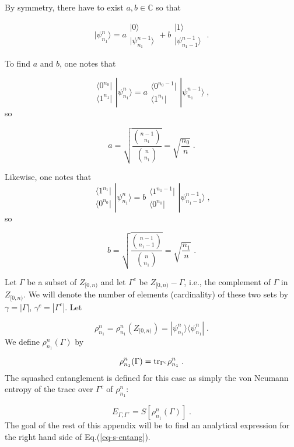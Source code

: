 \documentclass[12pt]{article}%
\newcommand{\qed}[0]{\newline\noindent{\bf QED }}
\newcommand{\bra}[1]{\langle#1|}
\newcommand{\ket}[1]{|#1\rangle}
\newcommand{\tr}[0]{{\rm tr }}
\newcommand{\beq}{\begin{equation}}
\newcommand{\eeq}{\end{equation}}
\newcommand{\CC}[0]{{ \mathbb{C}} }
\newcommand{\brazo}{ \begin{array}{r}
 \bra{0^{n_0}}
 \\
 \bra{1^{n_1}}
 \end{array}
 }
\begin{document}
{ By symmetry, there
 have to exist $a,b \in \CC$
 so that

 \beq
 \ket{\psi^n_{n_1}}=
 a
 \begin{array}{l}
 \ket{0}
 \\
 \ket{\psi^{n-1}_{n_1}}
 \end{array}
 +
 b
 \begin{array}{l}
 \ket{1}
 \\
 \ket{\psi^{n-1}_{n_1-1}}
 \end{array}
 \;.
 \eeq

 To find $a$ and $b$, one notes that

 \beq
 \brazo \ket{\psi^n_{n_1}}
 =
 a
 \begin{array}{r}
  \bra{0^{n_0-1}}
 \\
 \bra{1^{n_1}}
 \end{array}
  \ket{\psi^{n-1}_{n_1}}
 \;,
 \eeq
 so

 \beq
 a = \sqrt{\frac{{n-1\choose n_1}}{{n\choose n_1}}}
=
 \sqrt{\frac{n_0}{n}}
 \;.
 \eeq

Likewise, one notes that
 \beq
  \begin{array}{r}
  \bra{1^{n_1}}
 \\
 \bra{0^{n_0}}
 \end{array}
 \ket{\psi^n_{n_1}}
 =
 b
 \begin{array}{r}
  \bra{1^{n_1-1}}
 \\
 \bra{0^{n_0}}
 \end{array}
  \ket{\psi^{n-1}_{n_1-1}}
 \;,
 \eeq
 so

 \beq
 b = \sqrt{\frac{{n-1\choose n_1-1}}{{n\choose n_1}}}
=
 \sqrt{\frac{n_1}{n}}
 \;.
 \eeq
 \qed

Let  $\Gamma$ be a subset of
$ Z_{[0,n)}$ and let $\Gamma^c$ be
$Z_{[0,n)}-\Gamma$, i.e.,  the complement
 of
$\Gamma$ in
$ Z_{[0,n)}$.
We will denote the number of elements
(cardinality) of these two sets by
$\gamma = |\Gamma|$,
$\gamma^c = |\Gamma^c|$.
Let

\beq
\rho^n_{n_1}= \rho^n_{n_1}(Z_{[0,n)})
=
\ket{\psi^n_{n_1}}
\bra{\psi^n_{n_1}}
\;.
\eeq
We define $\rho^n_{n_1}(\Gamma)$ by

\beq
\rho^n_{n_1}(\Gamma) =
\tr_{\Gamma^c}
\rho^n_{n_1}
\;.\label{eq-rho-n-none}
\eeq
The squashed entanglement is defined
for this case as simply the von Neumann entropy
of the trace over $\Gamma^c$ of $\rho^n_{n_1}$:

\beq
E_{\Gamma, \Gamma^c} = S[\rho^n_{n_1}(\Gamma)]
\;.
\label{eq-s-entang}
\eeq
The goal of the rest of this appendix will
be to find an analytical expression for the
right hand side of Eq.(\ref{eq-s-entang}).

}
\end{document}
